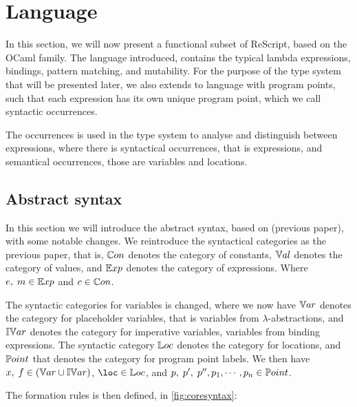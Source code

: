 \documentclass[../../master.tex]{subfiles}
\begin{document}
\section{Language}\label{sec:lang}
In this section, we will now present a functional subset of ReScript, based on the OCaml family.
The language introduced, contains the typical lambda expressions, bindings, pattern matching, and mutability.
For the purpose of the type system that will be presented later, we also extends to language with program points, such that each expression has its own unique program point, which we call syntactic occurrences.

The occurrences is used in the type system to analyse and distinguish between expressions, where there is syntactical occurrences, that is expressions, and semantical occurrences, those are variables and locations.

\subsection{Abstract syntax}
In this section we will introduce the abstract syntax, based on (previous paper), with some notable changes.
We reintroduce the syntactical categories as the previous paper, that is, $\mathbb{C}on$ denotes the category of constants, $\mathbb{V}al$ denotes the category of values, and $\mathbb{E}xp$ denotes the category of expressions.
Where $e, \; m \in \mathbb{E}xp$ and $c \in \mathbb{C}on$.

The syntactic categories for variables is changed, where we now have $\mathbb{V}ar$ denotes the category for placeholder variables, that is variables from $\lambda$-abstractions, and $\mathbb{IV}ar$ denotes the category for imperative variables, variables from binding expressions.
The syntactic category $\mathbb{L}oc$ denotes the category for locations, and $\mathbb{P}oint$ that denotes the category for program point labels.
We then have $x,\;f\in(\mathbb{V}ar\cup\mathbb{IV}ar)$, $\loc\in\Loc$, and $p,\;p',\;p'',p_1,\cdots,p_n\in\mathbb{P}oint$.

The formation rules is then defined, in \cref{fig:coresyntax}:
\end{document}
